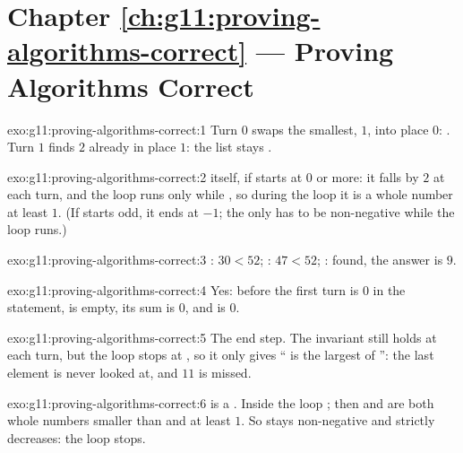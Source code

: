 \section*{Chapter \ref{ch:g11:proving-algorithms-correct} --- Proving Algorithms Correct}

\begin{solution}{exo:g11:proving-algorithms-correct:1}
Turn $0$ swaps the smallest, $1$, into place $0$: \code{[1, 2, 9, 5, 7]}. Turn $1$ finds $2$ already in place $1$:
the list stays \code{[1, 2, 9, 5, 7]}.
\end{solution}

\begin{solution}{exo:g11:proving-algorithms-correct:2}
 itself, if  starts at $0$ or more: it falls by $2$ at each turn, and the loop runs only while
, so during the loop it is a whole number at least $1$. (If  starts odd, it ends at $-1$; the
 only has to be non-negative while the loop runs.)
\end{solution}

\begin{solution}{exo:g11:proving-algorithms-correct:3}
: $30 < 52$; : $47 < 52$; : found, the answer is
$9$.
\end{solution}

\begin{solution}{exo:g11:proving-algorithms-correct:4}
Yes: before the first turn  is $0$ in the statement,  is empty, its sum is $0$, and  is
$0$.
\end{solution}

\begin{solution}{exo:g11:proving-algorithms-correct:5}
The end step. The invariant still holds at each turn, but the loop stops at , so it only gives
`` is the largest of '': the last element is never looked at, and $11$ is missed.
\end{solution}

\begin{solution}{exo:g11:proving-algorithms-correct:6}
 is a . Inside the loop ; then  and  are both whole numbers smaller
than  and at least $1$. So  stays non-negative and strictly decreases: the loop stops.
\end{solution}

